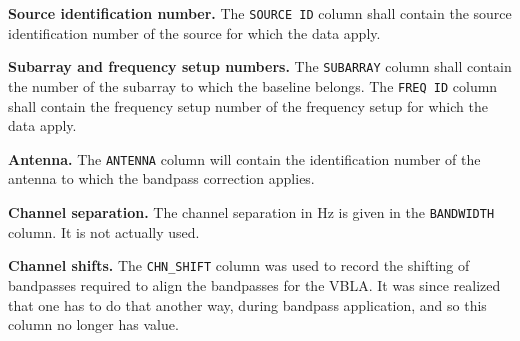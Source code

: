 \documentclass[twoside]{article}
\begin{document}
{\bf Source identification number.}  The {\tt SOURCE ID} column shall
contain the source identification number of the source for which the
data apply.

{\bf Subarray  and frequency setup numbers.} The {\tt SUBARRAY} column
shall contain the number of the subarray to which the baseline belongs.
The {\tt FREQ ID} column shall contain the frequency setup number of
the frequency setup for which the data apply.

{\bf Antenna.} The {\tt ANTENNA} column will contain the
identification number of the antenna to which the bandpass correction
applies.

{\bf Channel separation.} The channel separation in Hz is given in the
{\tt BANDWIDTH} column.  It is not actually used.

{\bf Channel shifts.} The {\tt CHN\_SHIFT} column was used to record
the shifting of bandpasses required to align the bandpasses for the
VBLA\@.  It was since realized that one has to do that another way,
during bandpass application, and so this column no longer has value.
\end{document}
